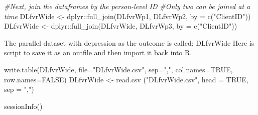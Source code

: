 \documentclass[
  english,
]{book}
\newenvironment{Shaded}{\begin{snugshade}}{\end{snugshade}}
\newcommand{\AttributeTok}[1]{\textcolor[rgb]{0.77,0.63,0.00}{#1}}
\newcommand{\CommentTok}[1]{\textcolor[rgb]{0.56,0.35,0.01}{\textit{#1}}}
\newcommand{\ConstantTok}[1]{\textcolor[rgb]{0.00,0.00,0.00}{#1}}
\newcommand{\FunctionTok}[1]{\textcolor[rgb]{0.00,0.00,0.00}{#1}}
\newcommand{\NormalTok}[1]{#1}
\newcommand{\OtherTok}[1]{\textcolor[rgb]{0.56,0.35,0.01}{#1}}
\newcommand{\SpecialCharTok}[1]{\textcolor[rgb]{0.00,0.00,0.00}{#1}}
\newcommand{\StringTok}[1]{\textcolor[rgb]{0.31,0.60,0.02}{#1}}
\begin{document}
\begin{Shaded}
\begin{Highlighting}[]
\CommentTok{\#Next, join the dataframes by the person{-}level ID}
\CommentTok{\#Only two can be joined at a time}
\NormalTok{DLfvrWide }\OtherTok{\textless{}{-}}\NormalTok{ dplyr}\SpecialCharTok{::}\FunctionTok{full\_join}\NormalTok{(DLfvrWp1, DLfvrWp2, }\AttributeTok{by =} \FunctionTok{c}\NormalTok{(}\StringTok{"ClientID"}\NormalTok{))}
\NormalTok{DLfvrWide }\OtherTok{\textless{}{-}}\NormalTok{ dplyr}\SpecialCharTok{::}\FunctionTok{full\_join}\NormalTok{(DLfvrWide, DLfvrWp3,  }\AttributeTok{by =} \FunctionTok{c}\NormalTok{(}\StringTok{"ClientID"}\NormalTok{))}
\end{Highlighting}
\end{Shaded}

The parallel dataset with depression as the outcome is called: DLfvrWide Here is script to save it as an outfile and then import it back into R.

\begin{Shaded}
\begin{Highlighting}[]
\FunctionTok{write.table}\NormalTok{(DLfvrWide, }\AttributeTok{file=}\StringTok{"DLfvrWide.csv"}\NormalTok{, }\AttributeTok{sep=}\StringTok{","}\NormalTok{, }\AttributeTok{col.names=}\ConstantTok{TRUE}\NormalTok{, }\AttributeTok{row.names=}\ConstantTok{FALSE}\NormalTok{)}
\NormalTok{DLfvrWide }\OtherTok{\textless{}{-}} \FunctionTok{read.csv}\NormalTok{ (}\StringTok{"DLfvrWide.csv"}\NormalTok{, }\AttributeTok{head =} \ConstantTok{TRUE}\NormalTok{, }\AttributeTok{sep =} \StringTok{","}\NormalTok{)}
\end{Highlighting}
\end{Shaded}

\begin{Shaded}
\begin{Highlighting}[]
\FunctionTok{sessionInfo}\NormalTok{()}
\end{Highlighting}
\end{Shaded}
\end{document}
